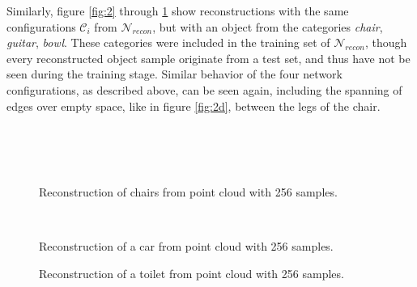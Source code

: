  Similarly, figure \ref{fig:2} through \ref{fig:5} show reconstructions with the same configurations $\mathcal{C}_i$ from $\mathcal{N}_{recon}$,
  but with an object from the categories \emph{chair}, \emph{guitar}, \emph{bowl}. These categories were included
  in the training set of $\mathcal{N}_{recon}$, though every reconstructed object sample originate from a test set, and thus have not be seen
  during the training stage.
  Similar behavior of the four network configurations, as described above, can be seen again, including the spanning of edges over empty space,
  like in figure \ref{fig:2d}, between the legs of the chair.
\begin{figure}[htbp]
  \centering
  \centering
  \\
  \\
  \\
  \caption{Reconstruction of chairs from point cloud with 256 samples.} \label{fig:5}
\end{figure}
\begin{figure}[htbp]
  \centering
  \\
  \caption{Reconstruction of a car from point cloud with 256 samples.} \label{fig:51}
\end{figure}
\begin{figure}[htbp]
  \centering
  \caption{Reconstruction of a toilet from point cloud with 256 samples.} \label{fig:52}
\end{figure}
